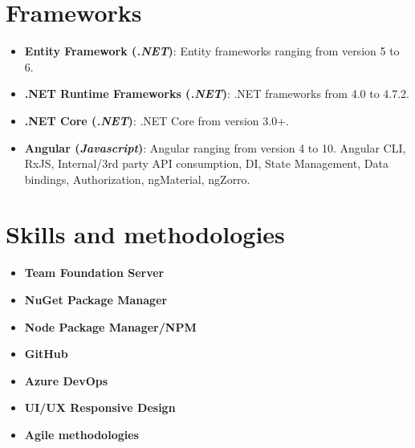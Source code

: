 \documentclass[letterpaper,11pt]{article}
\newcommand{\resumeItemItalic}[3]{
  \item\small{
    \textbf{#1 (\textit{#2})}{: #3 \vspace{-2pt}}
  }\vspace{-4pt}
}
\newcommand{\resumeItemAlign}[2]{
  \vspace{-1pt}\item\small{
    \textbf{#1} \hfill \textit{#2}
  }\vspace{-5pt}
}
\newcommand{\resumeSubHeadingListStart}{\begin{itemize}[leftmargin=*]}
\newcommand{\resumeSubHeadingListEnd}{\end{itemize}}
\begin{document}
\section{Frameworks}
\resumeSubHeadingListStart
  \resumeItemItalic{Entity Framework} {.NET}
    {Entity frameworks ranging from version 5 to 6.}
  \resumeItemItalic{.NET Runtime Frameworks}{.NET}
    {.NET frameworks from 4.0 to 4.7.2.}
\resumeItemItalic{.NET Core}{.NET}
    {.NET Core from version 3.0+.}
  \resumeItemItalic{Angular}{Javascript}
    {Angular ranging from version 4 to 10. Angular CLI, RxJS, Internal/3rd party API consumption, DI, State Management, Data bindings,  Authorization, ngMaterial, ngZorro.}
\resumeSubHeadingListEnd


\section{Skills and methodologies}

\resumeSubHeadingListStart
	\resumeItemAlign{Team Foundation Server}{}
	\resumeItemAlign{NuGet Package Manager}{}
	\resumeItemAlign{Node Package Manager/NPM}{}
	\resumeItemAlign{GitHub}{}
	\resumeItemAlign{Azure DevOps}{}
	\resumeItemAlign{UI/UX Responsive Design}{}
	\resumeItemAlign{Agile methodologies}{}
\resumeSubHeadingListEnd
\end{document}
